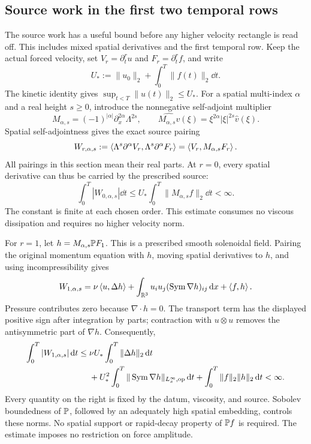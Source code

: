 \subsection{Source work in the first two temporal rows}
\label{r:app:recovered-source-work}
The source work has a useful bound before any higher velocity rectangle is
read off. This includes mixed spatial derivatives and the first temporal
row. Keep the actual forced velocity, set \(V_r=\partial_t^ru\) and
\(F_r=\partial_t^rf\), and write
\[
 U_*:=\|u_0\|_2+\int_0^T\|f(t)\|_2\dd t.
\]
The kinetic identity gives \(\sup_{t<T}\|u(t)\|_2\le U_*\).
For a spatial multi-index \(\alpha\) and a real height \(s\ge0\), introduce
the nonnegative self-adjoint multiplier
\[
 M_{\alpha,s}=(-1)^{|\alpha|}\partial_x^{2\alpha}\Lambda^{2s},
 \qquad
 \widehat{M_{\alpha,s}v}(\xi)
   =\xi^{2\alpha}|\xi|^{2s}\widehat v(\xi).
\]
Spatial self-adjointness gives the exact source pairing
\begin{equation}
 W_{r,\alpha,s}
 :=\left\langle \Lambda^s\partial^\alpha V_r,\Lambda^s\partial^\alpha F_r\right\rangle
 =\left\langle V_r,M_{\alpha,s}F_r\right\rangle.
 \label{r:eq:recovered-mixed-source-work}
\end{equation}
All pairings in this section mean their real parts. At \(r=0\), every
spatial derivative can thus be carried by the prescribed source:
\begin{equation}
 \int_0^T|W_{0,\alpha,s}|\dd t
 \le U_*\int_0^T\|M_{\alpha,s}f\|_2\dd t<\infty.
 \label{r:eq:recovered-source-row-zero}
\end{equation}
The constant is finite at each chosen order. This estimate consumes no
viscous dissipation and requires no higher velocity norm.

For \(r=1\), let \(h=M_{\alpha,s}\mathbb P F_1\). This is a prescribed smooth
solenoidal field. Pairing the original momentum equation with \(h\),
moving spatial derivatives to \(h\), and using incompressibility gives
\begin{equation}
 W_{1,\alpha,s}
 =\nu\left\langle u,\Delta h\right\rangle
  +\int_{\mathbb R^3}u_i u_j(\operatorname{Sym}\nabla h)_{ij}\,\mathrm d x
  +\left\langle f,h\right\rangle.
 \label{r:eq:recovered-source-row-one-identity}
\end{equation}
Pressure contributes zero because \(\nabla\cdot h=0\). The transport term
has the displayed positive sign after integration by parts; contraction
with \(u\otimes u\) removes the antisymmetric part of \(\nabla h\).
Consequently,
\begin{align}
 \int_0^T|W_{1,\alpha,s}|\,\mathrm d t
 \le{}&\nu U_*\int_0^T\|\Delta h\|_2\,\mathrm d t\notag\\
 &+U_*^2\int_0^T
       \|\operatorname{Sym}\nabla h\|_{L^\infty_x,\mathrm{op}}\,\mathrm d t
   +\int_0^T\|f\|_2\|h\|_2\,\mathrm d t<\infty.
 \label{r:eq:recovered-source-row-one-bound}
\end{align}
Every quantity on the right is fixed by the datum, viscosity, and source.
Sobolev boundedness of \(\mathbb P\), followed by an adequately high spatial
embedding, controls these norms. No spatial support or rapid-decay
property of \(\mathbb P f\) is required. The estimate imposes no restriction on
force amplitude.

